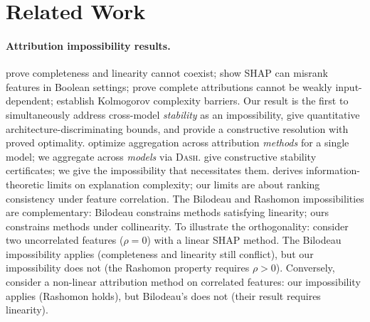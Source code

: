 \documentclass{article}
\newcommand{\DASH}{\textsc{Dash}}
\begin{document}
\section{Related Work}
\begingroup\sloppy
\label{sec:related}

\paragraph{Attribution impossibility results.}
\begin{sloppypar}
\citet{bilodeau2024impossibility} prove completeness and linearity cannot coexist;
\citet{huang2024failings} show SHAP can misrank features in Boolean settings;
\citet{srinivas2019full} prove complete attributions cannot be weakly
input-dependent; \citet{rao2025limits} establish Kolmogorov complexity barriers.
Our result is the first to simultaneously address cross-model
\emph{stability} as an impossibility, give quantitative architecture-discriminating
bounds, and provide a constructive resolution with proved optimality.
\citet{decker2024provably} optimize aggregation across attribution \emph{methods}
for a single model; we aggregate across \emph{models} via \DASH{}.
\citet{jin2025probabilistic} give constructive stability certificates; we give the
impossibility that necessitates them.
\citet{noguer2025mathematical} derives information-theoretic limits on explanation
complexity; our limits are about ranking consistency under feature correlation.
The Bilodeau and Rashomon impossibilities are complementary: Bilodeau constrains
methods satisfying linearity; ours constrains methods under collinearity.
To illustrate the orthogonality: consider two uncorrelated features ($\rho = 0$) with a linear SHAP method. The Bilodeau impossibility applies (completeness and linearity still conflict), but our impossibility does not (the Rashomon property requires $\rho > 0$). Conversely, consider a non-linear attribution method on correlated features: our impossibility applies (Rashomon holds), but Bilodeau's does not (their result requires linearity).
\end{sloppypar}
\end{document}
